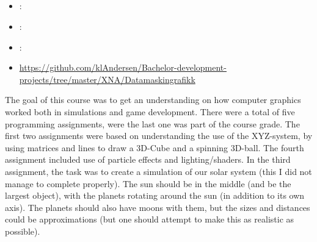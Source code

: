 \subsection[Computer Graphics]{}
\label{sec:comp_grahphics}
\begin{itemize} 
	\item {}: 
	\item {}: 
	\item {}: 
	\item {} \url{https://github.com/klAndersen/Bachelor-development-projects/tree/master/XNA/Datamaskingrafikk}
\end{itemize} 
The goal of this course was to get an understanding on how computer graphics worked both in simulations and game development.
There were a total of five programming assignments, were the last one was part of the course grade.
The first two assignments were based on understanding the use of the XYZ-system, by using matrices and lines to draw a 3D-Cube and a spinning 3D-ball.
The fourth assignment included use of particle effects and lighting/shaders.
\vspace{0.5em}\newline
In the third assignment, the task was to create a simulation of our solar system (this I did not manage to complete properly).
The sun should be in the middle (and be the largest object), with the planets rotating around the sun (in addition to its own axis). 
The planets should also have moons with them, but the sizes and distances could be approximations (but one should attempt to make this as realistic as possible).

